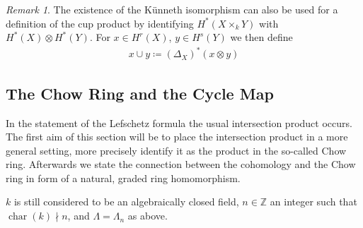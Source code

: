 \documentclass[english]{scrartcl}
\theoremstyle{definition}
\theoremstyle{remark}
\newtheorem{Rem}[Def]{Remark}
\newcommand*{\Z}{\mathds{Z}}
\DeclareMathOperator{\Char}{char} %
\newcommand*{\Diag}[1]{{\Delta_{#1}}} %
\begin{document}
\begin{Rem}
  The existence of the Künneth isomorphism can also be used for
  a definition of the cup product by identifying $H^*(X\times_k Y)$
  with $H^*(X)\otimes H^*(Y)$. For $x\in H^r(X)$, $y\in H^s(Y)$
  we then define
  \begin{gather*}
    x\cup y \coloneqq (\Diag{X})^*(x\otimes y)
  \end{gather*}
\end{Rem}

\subsection{The Chow Ring and the Cycle Map}
In the statement of the Lefschetz formula the usual intersection
product occurs. The first aim of this section will be to place the
intersection product in a more general setting, more precisely
identify it as the product in the so-called Chow ring. Afterwards we
state the connection between the cohomology and the Chow ring in form
of a natural, graded ring homomorphism.

$k$ is still considered to be an algebraically closed field,
$n\in\Z$ an integer such that $\Char(k)\nmid n$,
and $\Lambda=\Lambda_n$ as above.
\end{document}
